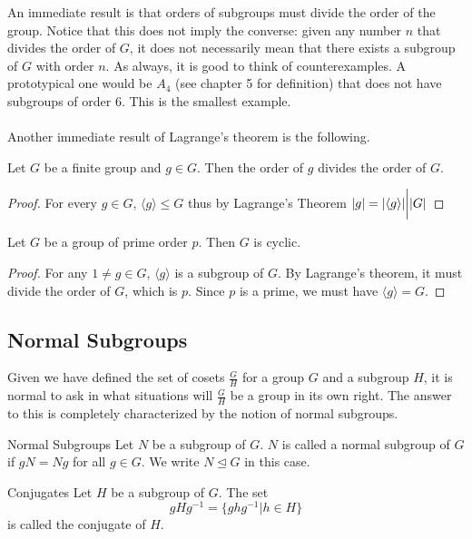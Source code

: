 \documentclass[a4paper]{article}
\begin{document}
An immediate result is that orders of subgroups must divide the order of the group. Notice that this does not imply the converse: given any number $n$ that divides the order of $G$, it does not necessarily mean that there exists a subgroup of $G$ with order $n$. As always, it is good to think of counterexamples. A prototypical one would be $A_4$ (see chapter 5 for definition) that does not have subgroups of order $6$. This is the smallest example. \\~\\

Another immediate result of Lagrange's theorem is the following. 

\begin{crl}{}{} Let $G$ be a finite group and $g\in G$. Then the order of $g$ divides the order of $G$. \tcbline
\begin{proof} For every $g\in G$, $\langle g\rangle\leq G$ thus by Lagrange's Theorem $\abs{g}=\abs{\langle g\rangle}\bigg{|}\abs{G}$
\end{proof}
\end{crl}

\begin{crl}{}{} Let $G$ be a group of prime order $p$. Then $G$ is cyclic. \tcbline
\begin{proof}
For any $1\neq g\in G$, $\langle g\rangle$ is a subgroup of $G$. By Lagrange's theorem, it must divide the order of $G$, which is $p$. Since $p$ is a prime, we must have $\langle g\rangle=G$. 
\end{proof}
\end{crl}

\subsection{Normal Subgroups}
Given we have defined the set of cosets $\frac{G}{H}$ for a group $G$ and a subgroup $H$, it is normal to ask in what situations will $\frac{G}{H}$ be a group in its own right. The answer to this is completely characterized by the notion of normal subgroups. 

\begin{defn}{Normal Subgroups}{} Let $N$ be a subgroup of $G$. $N$ is called a normal subgroup of $G$ if $gN=Ng$ for all $g\in G$. We write $N\trianglelefteq G$ in this case. 
\end{defn}

\begin{defn}{Conjugates}{} Let $H$ be a subgroup of $G$. The set $$gHg^{-1}=\{ghg^{-1}|h\in H\}$$ is called the conjugate of $H$. 
\end{defn}
\end{document}
